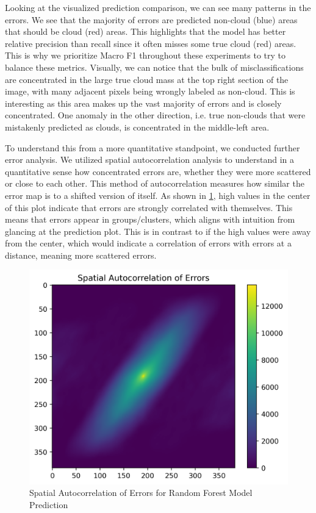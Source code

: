 \documentclass[10pt,letterpaper]{article}
\begin{document}
Looking at the visualized prediction comparison, we can see many patterns in the errors. We see that the majority of errors are predicted non-cloud (blue) areas that should be cloud (red) areas. This highlights that the model has better relative precision than recall since it often misses some true cloud (red) areas. This is why we prioritize Macro F1 throughout these experiments to try to balance these metrics. Visually, we can notice that the bulk of misclassifications are concentrated in the large true cloud mass at the top right section of the image, with many adjacent pixels being wrongly labeled as non-cloud. This is interesting as this area makes up the vast majority of errors and is closely concentrated. One anomaly in the other direction, i.e. true non-clouds that were mistakenly predicted as clouds, is concentrated in the middle-left area.

To understand this from a more quantitative standpoint, we conducted further error analysis. We utilized spatial autocorrelation analysis to understand in a quantitative sense how concentrated errors are, whether they were more scattered or close to each other. This method of autocorrelation measures how similar the error map is to a shifted version of itself. As shown in \ref{fig:spatial_error_correlation}, high values in the center of this plot indicate that errors are strongly correlated with themselves. This means that errors appear in groups/clusters, which aligns with intuition from glancing at the prediction plot. This is in contrast to if the high values were away from the center, which would indicate a correlation of errors with errors at a distance, meaning more scattered errors.

\begin{figure}[ht]
    \centering
    \includegraphics[width=0.5\linewidth]{figs/spatial_error_correlation.png}
    \caption{Spatial Autocorrelation of Errors for Random Forest Model Prediction}
    \label{fig:spatial_error_correlation}
\end{figure}
\end{document}
